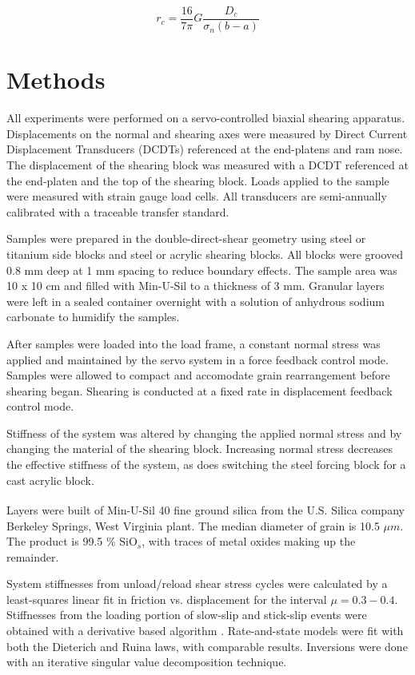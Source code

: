 \documentclass[11pt]{article}
\begin{document}
\begin{equation}
    r_c = \frac{16}{7\pi}G \frac{D_c}{\sigma_n (b-a)}
    \label{equation:rc}
\end{equation}

\section{Methods}
All experiments were performed on a servo-controlled biaxial shearing apparatus.
Displacements on the normal and shearing axes were measured by Direct Current
Displacement Transducers (DCDTs) referenced at the end-platens and ram nose. The
displacement of the shearing block was measured with a DCDT referenced at the
end-platen and the top of the shearing block. Loads applied to the sample were
measured with strain gauge load cells. All transducers are semi-annually
calibrated with a traceable transfer standard.

Samples were prepared in the double-direct-shear geometry using steel or
titanium side blocks and steel or acrylic shearing blocks. All blocks were
grooved 0.8 mm deep at 1 mm spacing to reduce boundary effects. The sample area
was 10 x 10 cm and filled with Min-U-Sil to a thickness of 3 mm. Granular layers
were left in a sealed container overnight with a solution of anhydrous sodium
carbonate to humidify the samples.

After samples were loaded into the load frame, a constant normal stress was
applied and maintained by the servo system in a force feedback control mode.
Samples were allowed to compact and accomodate grain rearrangement before
shearing began. Shearing is conducted at a fixed rate in displacement feedback
control mode.

Stiffness of the system was altered by changing the applied normal stress and by
changing the material of the shearing block. Increasing normal stress decreases
the effective stiffness of the system, as does switching the steel forcing block
for a cast acrylic block.

Layers were built of Min-U-Sil\textsuperscript{\textregistered} 40 fine ground
silica from the U.S. Silica\textsuperscript{\textregistered} company Berkeley
Springs, West Virginia plant. The median diameter of grain is 10.5 $\mu m$. The
product is 99.5 \% SiO$_s$, with traces of metal oxides making up the remainder.

System stiffnesses from unload/reload shear stress cycles were calculated by a
least-squares linear fit in friction vs. displacement for the interval $\mu =
0.3-0.4$. Stiffnesses from the loading portion of slow-slip and stick-slip
events were obtained with a derivative based algorithm \cite{Leeman:2015}.
Rate-and-state models were fit with both the Dieterich and
Ruina laws, with comparable results. Inversions were done with an iterative
singular value decomposition technique.
\end{document}
